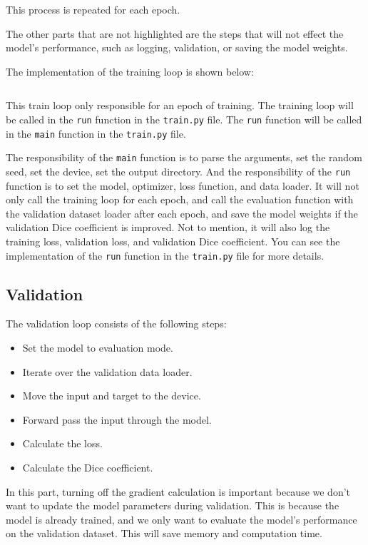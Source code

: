 This process is repeated for each epoch.

The other parts that are not highlighted are the steps that will not effect the model's performance, such as logging, validation, or saving the model weights.

The implementation of the training loop is shown below:

\inputminted[firstline=23, lastline=56, highlightlines={29,38,39,41,42,48-51}]{python}{../src/train.py}

This train loop only responsible for an epoch of training.
The training loop will be called in the \texttt{run} function in the \texttt{train.py} file.
The \texttt{run} function will be called in the \texttt{main} function in the \texttt{train.py} file.

The responsibility of the \texttt{main} function is to parse the arguments, set the random seed, set the device, set the output directory.
And the responsibility of the \texttt{run} function is to set the model, optimizer, loss function, and data loader.
It will not only call the training loop for each epoch, and call the evaluation function with the validation dataset loader after each epoch, and save the model weights if the validation Dice coefficient is improved.
Not to mention, it will also log the training loss, validation loss, and validation Dice coefficient.
You can see the implementation of the \texttt{run} function in the \texttt{train.py} file for more details.


\subsection{Validation}

The validation loop consists of the following steps:
\begin{itemize}
    \item Set the model to evaluation mode.
    \item Iterate over the validation data loader.
    \item Move the input and target to the device.
    \item Forward pass the input through the model.
    \item Calculate the loss.
    \item Calculate the Dice coefficient.
\end{itemize}

In this part, turning off the gradient calculation is important because we don't want to update the model parameters during validation.
This is because the model is already trained, and we only want to evaluate the model's performance on the validation dataset.
This will save memory and computation time.

